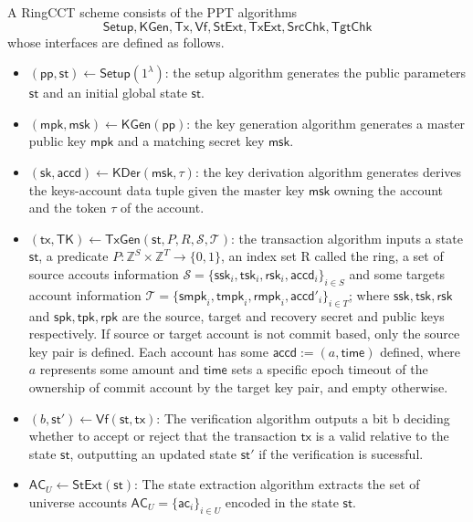 \begin{definition}
    A RingCCT scheme consists of the PPT algorithms 
    \[\mathsf{Setup},\mathsf{KGen,Tx,Vf,StExt,TxExt,SrcChk,TgtChk}\] 
    whose interfaces are defined as follows.
    \begin{itemize}
        \item $(\mathsf{pp,st}) \gets \mathsf{Setup}(1^\lambda)$: the setup algorithm generates the public parameters $\mathsf{st}$ and an initial global state $\mathsf{st}$.
        \item $(\mathsf{mpk},\mathsf{msk}) \gets \mathsf{KGen}(\mathsf{pp})$: the key generation algorithm generates a master public key $\mathsf{mpk}$ and a matching secret key $\mathsf{msk}$.
        \item $(\mathsf{sk},\mathsf{accd}) \gets \mathsf{KDer}(\mathsf{msk, \tau})$: the key derivation algorithm generates derives the keys-account data tuple given the master key $\mathsf{msk}$ owning the account and the token $\tau$ of the account.
        \item $(\mathsf{tx,TK}) \gets \mathsf{TxGen}(\mathsf{st},P,R,\mathcal{S},\mathcal{T})$: the transaction algorithm inputs a state $\mathsf{st}$, a predicate $P: \mathbb{Z}^S \times \mathbb{Z}^T \rightarrow \{0,1\}$, an index set R called the ring, a set of source accouts information $\mathcal{S} = \{\mathsf{ssk}_i, \mathsf{tsk}_i, \mathsf{rsk}_i, \mathsf{accd}_i\}_{i\in S}$ and some targets account information $\mathcal{T} = \{\mathsf{smpk}_i, \mathsf{tmpk}_i, \mathsf{rmpk}_i, \mathsf{accd}'_i\}_{i\in T}$; where $\mathsf{ssk,tsk,rsk}$ and $\mathsf{spk,tpk,rpk}$ are the source, target and recovery secret and public keys respectively. If source or target account is not commit based, only the source key pair is defined. Each account has some $\mathsf{accd} := (a,\mathsf{time})$ defined, where $a$ represents some amount and $\mathsf{time}$ sets a specific epoch timeout of the ownership of commit account by the target key pair, and empty otherwise. 
        \item $(b,\mathsf{st}') \gets \mathsf{Vf}(\mathsf{st,tx})$: The verification algorithm outputs a bit b deciding whether to accept or reject that the transaction $\mathsf{tx}$ is a valid relative to the state $\mathsf{st}$, outputting an updated state $\mathsf{st}'$ if the verification is sucessful.
    \item $\mathsf{AC}_U \gets \mathsf{StExt}(\mathsf{st})$: The state extraction algorithm
    extracts the set of universe accounts $\mathsf{AC}_U = \{\mathsf{ac}_i\}_{i \in U}$ encoded in the state $\mathsf{st}$.

\end{itemize}
\end{definition}
